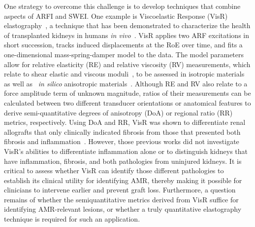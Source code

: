 One strategy to overcome this challenge is to develop techniques that combine aspects of ARFI and SWEI. One example is Viscoelastic Response (VisR) elastography~\cite{selzo_Quantitative_2016}, a technique that has been demonstrated to characterize the health of transplanted kidneys in humans \emph{in vivo}~\cite{hossain_Evaluating_2018, yokoyama_vivo_2022}. VisR applies two ARF excitations in short succession, tracks induced displacements at the RoE over time, and fits a one-dimensional mass-spring-damper model to the data. The model parameters allow for relative elasticity (RE) and relative viscosity (RV) measurements, which relate to shear elastic and viscous moduli~\cite{hossain_Viscoelastic_2020}, to be assessed in isotropic materials as well as ~\emph{in silico} anisotropic materials~\cite{muhtadi_VisR_2024}. Although RE and RV also relate to a force amplitude term of unknown magnitude, ratios of their measurements can be calculated between two different transducer orientations or anatomical features to derive semi-quantitative degrees of anisotropy (DoA) or regional ratio (RR) metrics, respectively. Using DoA and RR, VisR was shown to differentiate renal allografts that only clinically indicated fibrosis from those that presented both fibrosis and inflammation~\cite{yokoyama_vivo_2022}. However, those previous works did not investigate VisR's abilities to differentiate inflammation alone or to distinguish kidneys that have inflammation, fibrosis, and both pathologies from uninjured kidneys. It is critical to assess whether VisR can identify those different pathologies to establish its clinical utility for identifying AMR, thereby making it possible for clinicians to intervene earlier and prevent graft loss. Furthermore, a question remains of whether the semiquantitative metrics derived from VisR suffice for identifying AMR-relevant lesions, or whether a truly quantitative elastography technique is required for such an application.


